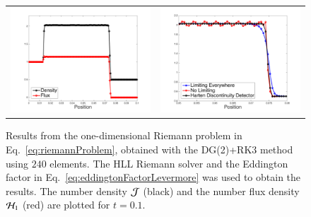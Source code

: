 \documentclass[11pt,letterpaper,twoside,english,final]{article}
\begin{document}
\begin{figure}[h]
  \centering
  \begin{tabular}{cc}
    \includegraphics[scale=0.4]{./Figures/RiemannProblem1D} &
    \includegraphics[scale=0.4]{./Figures/RiemannProblem1D_Limiters}
  \end{tabular}
  \vspace{-0.1in}
  \flushleft\caption[Results from the one-dimensional Riemann problem in Eq.~\eqref{eq:riemannProblem}, obtained with the DG(2)+RK3 scheme using $240$ elements.]{Results from the one-dimensional Riemann problem in Eq.~\eqref{eq:riemannProblem}, obtained with the DG(2)+RK3 method using $240$ elements.  The HLL Riemann solver and the Eddington factor in Eq.~\eqref{eq:eddingtonFactorLevermore} was used to obtain the results.  \textmd{The number density $\mathcal{J}$ (black) and the number flux density $\mathcal{H}_{1}$ (red) are plotted for $t=0.1$.}}
  \label{fig:riemannProblem}
\end{figure}
\end{document}

